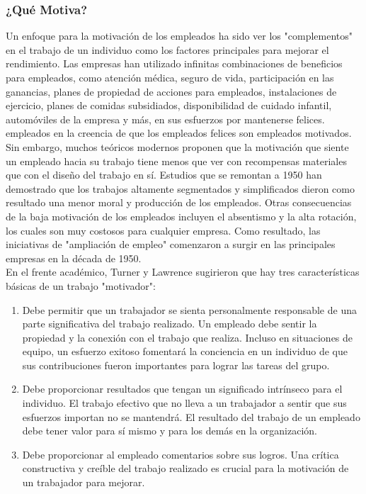 \documentclass[10pt]{book}
\begin{document}
\subsubsection{¿Qué Motiva?}
Un enfoque para la motivación de los empleados ha sido ver los "complementos" en el trabajo de un individuo como los factores principales para mejorar el rendimiento. Las empresas han utilizado infinitas combinaciones de beneficios para empleados, como atención médica, seguro de vida, participación en las ganancias, planes de propiedad de acciones para empleados, instalaciones de ejercicio, planes de comidas subsidiados, disponibilidad de cuidado infantil, automóviles de la empresa y más, en sus esfuerzos por mantenerse felices. empleados en la creencia de que los empleados felices son empleados motivados.\\
Sin embargo, muchos teóricos modernos proponen que la motivación que siente un empleado hacia su trabajo tiene menos que ver con recompensas materiales que con el diseño del trabajo en sí. Estudios que se remontan a 1950 han demostrado que los trabajos altamente segmentados y simplificados dieron como resultado una menor moral y producción de los empleados. Otras consecuencias de la baja motivación de los empleados incluyen el absentismo y la alta rotación, los cuales son muy costosos para cualquier empresa. Como resultado, las iniciativas de "ampliación de empleo" comenzaron a surgir en las principales empresas en la década de 1950.\\
En el frente académico, Turner y Lawrence sugirieron que hay tres características básicas de un trabajo "motivador":\\
\begin{enumerate}[\bfseries 1.]
\item Debe permitir que un trabajador se sienta personalmente responsable de una parte significativa del trabajo realizado. Un empleado debe sentir la propiedad y la conexión con el trabajo que realiza. Incluso en situaciones de equipo, un esfuerzo exitoso fomentará la conciencia en un individuo de que sus contribuciones fueron importantes para lograr las tareas del grupo.
\item Debe proporcionar resultados que tengan un significado intrínseco para el individuo. El trabajo efectivo que no lleva a un trabajador a sentir que sus esfuerzos importan no se mantendrá. El resultado del trabajo de un empleado debe tener valor para sí mismo y para los demás en la organización.
\item Debe proporcionar al empleado comentarios sobre sus logros. Una crítica constructiva y creíble del trabajo realizado es crucial para la motivación de un trabajador para mejorar.
\end{enumerate}
\end{document}
